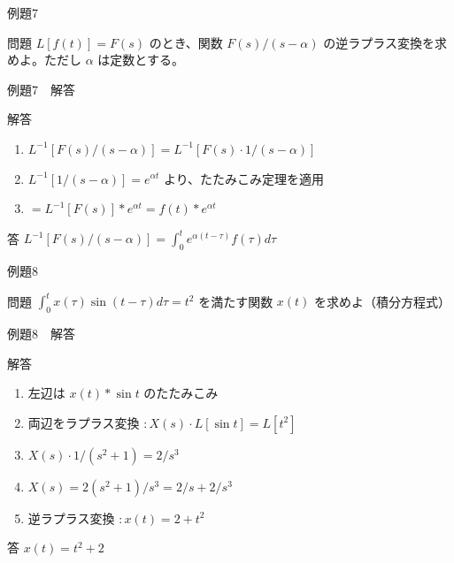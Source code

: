 \documentclass[aspectratio=43,professionalfonts,handout]{beamer}
\begin{document}
\begin{frame}{例題7}
  \begin{exampleblock}{問題}
    $L[f(t)] = F(s)$ のとき、関数 $F(s)/(s-\alpha)$ の逆ラプラス変換を求めよ。ただし $\alpha$ は定数とする。\\[2pt]
  \end{exampleblock}
\end{frame}

\begin{frame}{例題7　解答}
  \begin{exampleblock}{解答}
  \begin{enumerate}[1.]
    \item[] $L^{-1}[F(s)/(s-\alpha)] = L^{-1}[F(s) \cdot 1/(s-\alpha)]$
    \item[] $L^{-1}[1/(s-\alpha)] = e^{\alpha t}$ より、たたみこみ定理を適用
    \item[] $= L^{-1}[F(s)] * e^{\alpha t} = f(t) * e^{\alpha t}$
  \end{enumerate}
  \end{exampleblock}
  \begin{alertblock}{答}
    $L^{-1}[F(s)/(s-\alpha)] = \int_{0}^t e^{\alpha(t-\tau)} f(\tau) d\tau$
  \end{alertblock}
\end{frame}

\begin{frame}{例題8}
  \begin{exampleblock}{問題}
    $\int_{0}^t x(\tau) \sin(t-\tau) d\tau = t^{2}$ を満たす関数 $x(t)$ を求めよ（積分方程式）\\[2pt]
  \end{exampleblock}
\end{frame}

\begin{frame}{例題8　解答}
  \begin{exampleblock}{解答}
  \begin{enumerate}[1.]
    \item[] 左辺は $x(t) * \sin t$ のたたみこみ
    \item[] 両辺をラプラス変換 $: X(s) \cdot L[\sin t] = L[t^{2}]$
    \item[] $X(s) \cdot 1/(s^{2}+1) = 2/s^{3}$
    \item[] $X(s) = 2(s^{2}+1)/s^{3} = 2/s + 2/s^{3}$
    \item[] 逆ラプラス変換 $: x(t) = 2 + t^{2}$
  \end{enumerate}
  \end{exampleblock}
  \begin{alertblock}{答}
    $x(t) = t^{2} + 2$
  \end{alertblock}
\end{frame}
\end{document}
